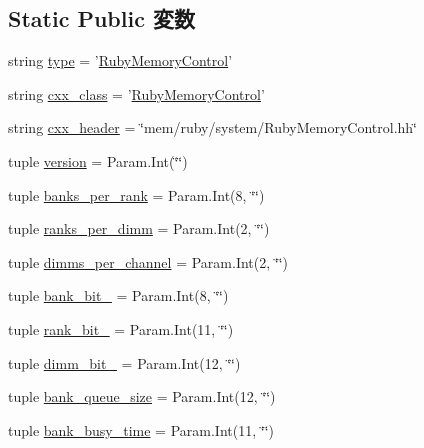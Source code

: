 \subsection*{Static Public 変数}
\begin{DoxyCompactItemize}
\item 
string \hyperlink{classRubyMemoryControl_1_1RubyMemoryControl_acce15679d830831b0bbe8ebc2a60b2ca}{type} = '\hyperlink{classRubyMemoryControl_1_1RubyMemoryControl}{RubyMemoryControl}'
\item 
string \hyperlink{classRubyMemoryControl_1_1RubyMemoryControl_a58cd55cd4023648e138237cfc0822ae3}{cxx\_\-class} = '\hyperlink{classRubyMemoryControl_1_1RubyMemoryControl}{RubyMemoryControl}'
\item 
string \hyperlink{classRubyMemoryControl_1_1RubyMemoryControl_a17da7064bc5c518791f0c891eff05fda}{cxx\_\-header} = \char`\"{}mem/ruby/system/RubyMemoryControl.hh\char`\"{}
\item 
tuple \hyperlink{classRubyMemoryControl_1_1RubyMemoryControl_a76aa01cd80eeb03b381ebe36f17c16b2}{version} = Param.Int(\char`\"{}\char`\"{})
\item 
tuple \hyperlink{classRubyMemoryControl_1_1RubyMemoryControl_a594ca2e17132484351baf7e79ecb5868}{banks\_\-per\_\-rank} = Param.Int(8, \char`\"{}\char`\"{})
\item 
tuple \hyperlink{classRubyMemoryControl_1_1RubyMemoryControl_a4379b7cd9ddf19ae69a6e8b9cda3c2fd}{ranks\_\-per\_\-dimm} = Param.Int(2, \char`\"{}\char`\"{})
\item 
tuple \hyperlink{classRubyMemoryControl_1_1RubyMemoryControl_ab0ee5c82a6215be33e6401cd427fcb3b}{dimms\_\-per\_\-channel} = Param.Int(2, \char`\"{}\char`\"{})
\item 
tuple \hyperlink{classRubyMemoryControl_1_1RubyMemoryControl_ac8a3aa3847ecf865d9c46e7ef63bf83b}{bank\_\-bit\_} = Param.Int(8, \char`\"{}\char`\"{})
\item 
tuple \hyperlink{classRubyMemoryControl_1_1RubyMemoryControl_aa4bac3fc7a7559fe0a7c79cf4d7fa204}{rank\_\-bit\_} = Param.Int(11, \char`\"{}\char`\"{})
\item 
tuple \hyperlink{classRubyMemoryControl_1_1RubyMemoryControl_a7ef7481aba35e3e12db5b4686afc6d7a}{dimm\_\-bit\_} = Param.Int(12, \char`\"{}\char`\"{})
\item 
tuple \hyperlink{classRubyMemoryControl_1_1RubyMemoryControl_a5098446f6c7ea2b9f7d19d3d373d63e2}{bank\_\-queue\_\-size} = Param.Int(12, \char`\"{}\char`\"{})
\item 
tuple \hyperlink{classRubyMemoryControl_1_1RubyMemoryControl_a1ad2fdc97ba66f14a2699bb9733be7c4}{bank\_\-busy\_\-time} = Param.Int(11, \char`\"{}\char`\"{})

\end{DoxyCompactItemize}
